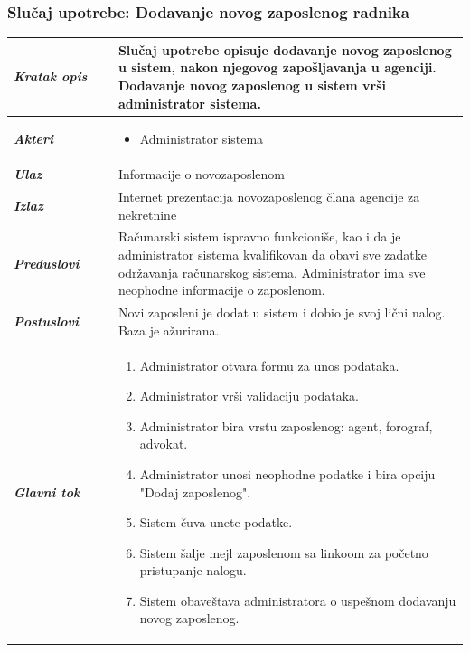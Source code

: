 \documentclass[20pt]{article}
\begin{document}
\subsubsection{\bfseries \large Slu\v{c}aj upotrebe: Dodavanje novog zaposlenog radnika}

\begin{center}
\begin{longtable}{p{0.23\linewidth} p{0.77\linewidth}}
\hline

 {\it \bfseries Kratak opis} & Slu\v {c}aj upotrebe opisuje dodavanje novog zaposlenog u sistem, nakon njegovog zapo\v {s}ljavanja u agenciji. Dodavanje novog zaposlenog u sistem vr\v {s}i administrator sistema.\\ 
 
 \hline
 {\it \bfseries Akteri} & \begin{itemize}
    \item Administrator sistema
\end{itemize}\\
\hline

 {\it \bfseries Ulaz} & Informacije o novozaposlenom\\
 \hline
 
 {\it \bfseries Izlaz} & Internet prezentacija novozaposlenog \v {c}lana agencije za nekretnine\\
 \hline
 
 {\it \bfseries Preduslovi} & Ra\v {c}unarski sistem ispravno funkcioni\v {s}e, kao i da je administrator sistema kvalifikovan da obavi sve zadatke odr\v {z}avanja ra\v {c}unarskog sistema. Administrator ima sve neophodne informacije o zaposlenom.\\
 \hline

 {\it \bfseries Postuslovi} & Novi zaposleni je dodat u sistem i dobio je svoj li\v {c}ni nalog. Baza je a\v {z}urirana.\\
 \hline

     {\it \bfseries Glavni tok} &  
     \begin{enumerate}
         \item Administrator otvara formu za unos podataka.
         \item Administrator vr\v {s}i validaciju podataka.
         \item Administrator bira vrstu zaposlenog: agent, forograf, advokat.
         \item Administrator unosi neophodne podatke i bira opciju "Dodaj zaposlenog".
         \item Sistem \v {c}uva unete podatke.
         \item Sistem \v {s}alje mejl zaposlenom sa linkoom za po\v {c}etno pristupanje nalogu.
         \item Sistem obave\v {s}tava administratora o uspe\v {s}nom dodavanju novog zaposlenog.
    \end{enumerate}\\
 \hline


\end{longtable}
\end{center}
\end{document}
